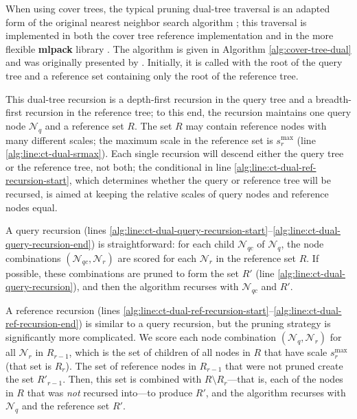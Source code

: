 When using cover trees, the typical pruning dual-tree traversal is an adapted
form of the original nearest neighbor search algorithm \citep[see
\texttt{Find-All-Nearest},][]{langford2006}; this traversal is implemented in
both the cover tree reference implementation and in the more flexible {\bf
mlpack} library \citep{mlpack2013}.  The algorithm is given in Algorithm
\ref{alg:cover-tree-dual} and was originally presented by
\citet{curtin2014dual}.  Initially, it is called with the root of the query tree
and a reference set containing only the root of the reference tree.

This dual-tree recursion is a depth-first recursion in the query tree and a
breadth-first recursion in the reference tree; to this end, the recursion
maintains one query node $\mathscr{N}_q$ and a reference set $R$.  The set $R$
may contain reference nodes with many different scales; the maximum scale in the
reference set is $s_r^{\max}$ (line \ref{alg:line:ct-dual-srmax}).  Each single
recursion will descend either the query tree or the reference tree, not both;
the conditional in line \ref{alg:line:ct-dual-ref-recursion-start}, which
determines whether the query or reference tree will be recursed, is aimed at
keeping the relative scales of query nodes and reference nodes equal.

A query recursion (lines
\ref{alg:line:ct-dual-query-recursion-start}--\ref{alg:line:ct-dual-query-recursion-end})
is straightforward: for each child $\mathscr{N}_{qc}$ of $\mathscr{N}_q$, the
node combinations $(\mathscr{N}_{qc}, \mathscr{N}_r)$ are scored for each
$\mathscr{N}_r$ in the reference set $R$.  If possible, these combinations are
pruned to form the set $R'$ (line \ref{alg:line:ct-dual-query-recursion}), and
then the algorithm recurses with $\mathscr{N}_{qc}$ and $R'$.

A reference recursion (lines
\ref{alg:line:ct-dual-ref-recursion-start}--\ref{alg:line:ct-dual-ref-recursion-end})
is similar to a query recursion, but the pruning strategy is significantly more
complicated.  We score each node combination $(\mathscr{N}_q, \mathscr{N}_r)$
for all $\mathscr{N}_r$ in $R_{r - 1}$, which is the set of children of all
nodes in $R$ that have scale $s_r^{\max}$ (that set is $R_r$).  The set of
reference nodes in $R_{r - 1}$ that were not pruned create the set $R'_{r - 1}$.
Then, this set is combined with $R \setminus R_r$---that is, each of the nodes
in $R$ that was {\em not} recursed into---to produce $R'$, and the algorithm
recurses with $\mathscr{N}_q$ and the reference set $R'$.

